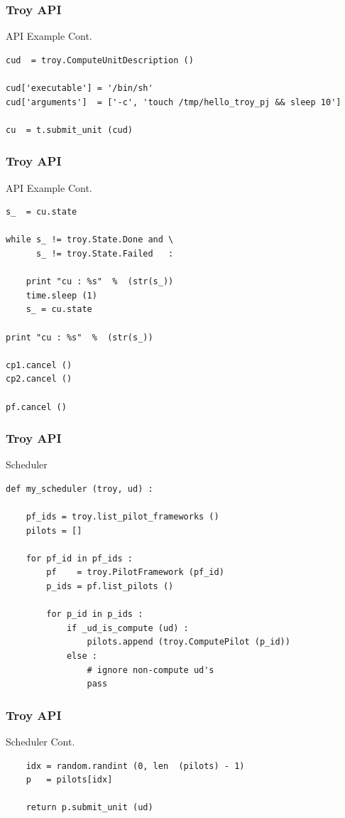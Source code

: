 \documentclass{beamer}
\begin{document}
\begin{frame}[fragile] 
 \frametitle{Troy API}
 {\footnotesize
  \begin{block}{API Example Cont.}
   \begin{verbatim}
cud  = troy.ComputeUnitDescription ()

cud['executable'] = '/bin/sh'
cud['arguments']  = ['-c', 'touch /tmp/hello_troy_pj && sleep 10']

cu  = t.submit_unit (cud)
   \end{verbatim}
  \end{block}
 }
\end{frame}

\begin{frame}[fragile] 
 \frametitle{Troy API}
 {\footnotesize
  \begin{block}{API Example Cont.}
   \begin{verbatim}
s_  = cu.state

while s_ != troy.State.Done and \
      s_ != troy.State.Failed   :

    print "cu : %s"  %  (str(s_))
    time.sleep (1)
    s_ = cu.state

print "cu : %s"  %  (str(s_))

cp1.cancel ()
cp2.cancel ()

pf.cancel ()
   \end{verbatim}
  \end{block}
 }
\end{frame}

\begin{frame}[fragile] 
 \frametitle{Troy API}
 {\footnotesize
  \begin{block}{Scheduler}
   \begin{verbatim}
def my_scheduler (troy, ud) :

    pf_ids = troy.list_pilot_frameworks ()
    pilots = []

    for pf_id in pf_ids :
        pf    = troy.PilotFramework (pf_id)
        p_ids = pf.list_pilots ()

        for p_id in p_ids :
            if _ud_is_compute (ud) :
                pilots.append (troy.ComputePilot (p_id))
            else :
                # ignore non-compute ud's
                pass
   \end{verbatim}
  \end{block}
 }
\end{frame}

\begin{frame}[fragile] 
 \frametitle{Troy API}
 {\footnotesize
  \begin{block}{Scheduler  Cont.}
   \begin{verbatim}
    idx = random.randint (0, len  (pilots) - 1)
    p   = pilots[idx]

    return p.submit_unit (ud)
   \end{verbatim}
  \end{block}
 }
\end{frame}
\end{document}
